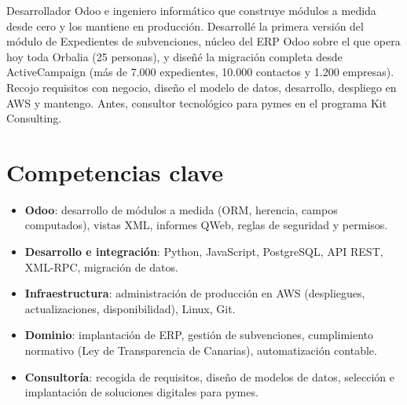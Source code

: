 \documentclass[11pt,a4paper,sans]{moderncv}
\begin{document}
\makecvtitle


\vspace{6pt}
\small{Desarrollador Odoo e ingeniero informático que construye módulos a medida desde cero y los mantiene en producción. Desarrollé la primera versión del módulo de Expedientes de subvenciones, núcleo del ERP Odoo sobre el que opera hoy toda Orbalia (25 personas), y diseñé la migración completa desde ActiveCampaign (más de 7.000 expedientes, 10.000 contactos y 1.200 empresas). Recojo requisitos con negocio, diseño el modelo de datos, desarrollo, despliego en AWS y mantengo. Antes, consultor tecnológico para pymes en el programa Kit Consulting.}


\section{Competencias clave}
\vspace{1pt}
\begin{itemize}

\item \textbf{Odoo}: desarrollo de módulos a medida (ORM, herencia, campos computados), vistas XML, informes QWeb, reglas de seguridad y permisos.

\item \textbf{Desarrollo e integración}: Python, JavaScript, PostgreSQL, API REST, XML-RPC, migración de datos.

\item \textbf{Infraestructura}: administración de producción en AWS (despliegues, actualizaciones, disponibilidad), Linux, Git.

\item \textbf{Dominio}: implantación de ERP, gestión de subvenciones, cumplimiento normativo (Ley de Transparencia de Canarias), automatización contable.

\item \textbf{Consultoría}: recogida de requisitos, diseño de modelos de datos, selección e implantación de soluciones digitales para pymes.

\end{itemize}
\end{document}
